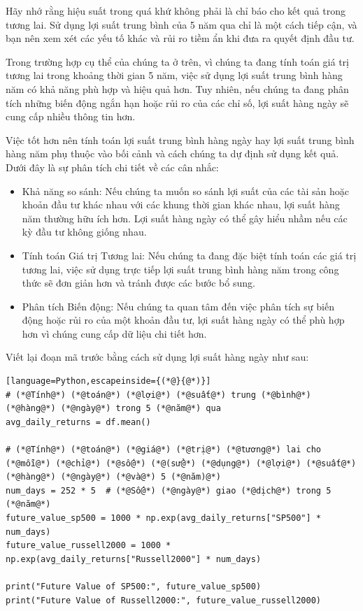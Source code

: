 Hãy nhớ rằng hiệu suất trong quá khứ không phải là chỉ báo cho kết quả trong tương lai. Sử dụng lợi suất trung bình của 5 năm qua chỉ là một cách tiếp cận, và bạn nên xem xét các yếu tố khác và rủi ro tiềm ẩn khi đưa ra quyết định đầu tư.

Trong trường hợp cụ thể của chúng ta ở trên, vì chúng ta đang tính toán giá trị tương lai trong khoảng thời gian 5 năm, việc sử dụng lợi suất trung bình hàng năm có khả năng phù hợp và hiệu quả hơn. Tuy nhiên, nếu chúng ta đang phân tích những biến động ngắn hạn hoặc rủi ro của các chỉ số, lợi suất hàng ngày sẽ cung cấp nhiều thông tin hơn.

Việc tốt hơn nên tính toán lợi suất trung bình hàng ngày hay lợi suất trung bình hàng năm phụ thuộc vào bối cảnh và cách chúng ta dự định sử dụng kết quả. Dưới đây là sự phân tích chi tiết về các cân nhắc:

\begin{itemize}
  \item Khả năng so sánh: Nếu chúng ta muốn so sánh lợi suất của các tài sản hoặc khoản đầu tư khác nhau với các khung thời gian khác nhau, lợi suất hàng năm thường hữu ích hơn. Lợi suất hàng ngày có thể gây hiểu nhầm nếu các kỳ đầu tư không giống nhau.
  \item Tính toán Giá trị Tương lai: Nếu chúng ta đang đặc biệt tính toán các giá trị tương lai, việc sử dụng trực tiếp lợi suất trung bình hàng năm trong công thức sẽ đơn giản hơn và tránh được các bước bổ sung.
  \item Phân tích Biến động: Nếu chúng ta quan tâm đến việc phân tích sự biến động hoặc rủi ro của một khoản đầu tư, lợi suất hàng ngày có thể phù hợp hơn vì chúng cung cấp dữ liệu chi tiết hơn.
\end{itemize}
Viết lại đoạn mã trước bằng cách sử dụng lợi suất hàng ngày như sau:

\begin{lstlisting}[language=Python,escapeinside={(*@}{@*)}]
# (*@Tính@*) (*@toán@*) (*@lợi@*) (*@suất@*) trung (*@bình@*) (*@hàng@*) (*@ngày@*) trong 5 (*@năm@*) qua
avg_daily_returns = df.mean()

# (*@Tính@*) (*@toán@*) (*@giá@*) (*@trị@*) (*@tương@*) lai cho (*@mỗi@*) (*@chỉ@*) (*@số@*) (*@(sử@*) (*@dụng@*) (*@lợi@*) (*@suất@*) (*@hàng@*) (*@ngày@*) (*@và@*) 5 (*@năm)@*)
num_days = 252 * 5  # (*@Số@*) (*@ngày@*) giao (*@dịch@*) trong 5 (*@năm@*)
future_value_sp500 = 1000 * np.exp(avg_daily_returns["SP500"] * num_days)
future_value_russell2000 = 1000 * np.exp(avg_daily_returns["Russell2000"] * num_days)

print("Future Value of SP500:", future_value_sp500)
print("Future Value of Russell2000:", future_value_russell2000)
\end{lstlisting}

